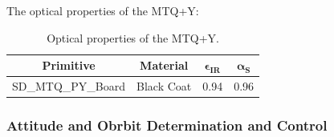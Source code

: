 \begin{table}[H]
  \centering
  \caption{Bulk properties of the magnetorquer (Positive Y axis) primitive.}
  \end{table}

  The optical properties of the MTQ+Y:

\begin{table}[H]
  \centering
  \begin{tabular}{@{}cccc@{}}
  \toprule
  \textbf{Primitive} & \textbf{Material} & $\mathbf{\epsilon_{IR}}$ & $\mathbf{\alpha_{S}}$ \\ \midrule
  SD\_MTQ\_PY\_Board & Black Coat       & 0.94                     & 0.96                  \\ \bottomrule
  \end{tabular}
  \caption{Optical properties of the MTQ+Y.}
\end{table}

\subsubsection{Attitude and Obrbit Determination and Control}

